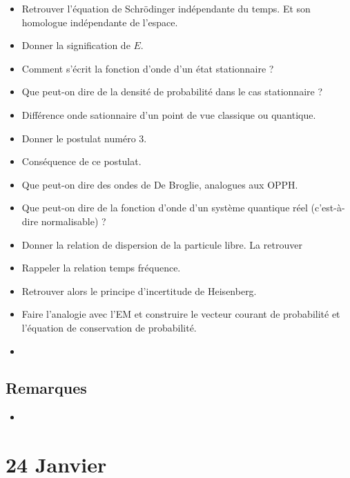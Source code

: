 \documentclass[a4paper, 11pt, hidelinks]{article}
\begin{document}
\begin{itemize}
    \item Retrouver l'équation de Schrödinger indépendante du temps. Et son homologue indépendante de l'espace. \cite{Chapitre21}
    \item Donner la signification de $E$. \cite{Chapitre21}
    \item Comment s'écrit la fonction d'onde d'un état stationnaire ? \cite{Chapitre21}
    \item Que peut-on dire de la densité de probabilité dans le cas stationnaire ? \cite{Chapitre21}
    \item Différence onde sationnaire d'un point de vue classique ou quantique. \cite{Chapitre21}
    \item Donner le postulat numéro 3. \cite{Chapitre21}
    \item Conséquence de ce postulat. \cite{Chapitre21}
    \item Que peut-on dire des ondes de De Broglie, analogues aux OPPH. \cite{Chapitre21}
    \item Que peut-on dire de la fonction d'onde d'un système quantique réel (c'est-à-dire normalisable) ? \cite{Chapitre21}
    \item Donner la relation de dispersion de la particule libre. La retrouver \cite{Chapitre21}
    \item Rappeler la relation temps fréquence. \cite{Chapitre21}
    \item Retrouver alors le principe d'incertitude de Heisenberg. \cite{Chapitre21}
    \item Faire l'analogie avec l'EM et construire le vecteur courant de probabilité et l'équation de conservation de probabilité. \cite{Chapitre21}
    \item 
\end{itemize}


\subsection{Remarques}



\begin{itemize}
    \item 
\end{itemize}






\section{24 Janvier}
\end{document}
